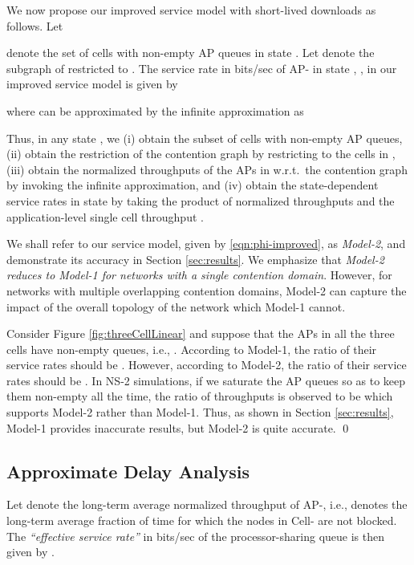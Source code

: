 \documentclass[10pt,a4paper,journal]{IEEEtran}
\theoremstyle{definition}
\theoremstyle{remark}
\theoremstyle{plain}
\begin{document}
We now propose our improved service model with short-lived downloads as follows. Let 
 
denote the set of cells with non-empty AP queues in state . Let  denote the subgraph of  restricted to . The service rate  in bits/sec of AP- in state , , in our improved service model is given by 
 
where  can be approximated by the infinite  approximation as 



Thus, in any state , we (i) obtain the subset  of cells with non-empty AP queues, (ii) obtain the restriction  of the contention graph  by restricting  to the cells in , (iii) obtain the normalized throughputs of the APs in  w.r.t.~the contention graph  by invoking the infinite  approximation, and (iv) obtain the state-dependent service rates in state  by taking the product of normalized throughputs and the application-level single cell throughput  . 

We shall refer to our service model, given by \eqref{eqn:phi-improved}, as \textit{Model-2}, and demonstrate its accuracy in Section \ref{sec:results}. We emphasize that \textit{Model-2 reduces to Model-1 for networks with a single contention domain}. However, for networks with multiple overlapping contention domains, Model-2 can capture the impact of the overall topology of the network which Model-1 cannot.


\begin{example}
\label{ex:three-cell-linear}
Consider Figure \ref{fig:threeCellLinear} and suppose that the APs in all the three cells have non-empty queues, i.e., . According to Model-1, the ratio of their service rates should be . However, according to Model-2, the ratio of their service rates should be . In NS-2 simulations, if we saturate the AP queues so as to keep them non-empty all the time, the ratio of throughputs is observed to be  which supports Model-2 rather than Model-1. Thus, as shown in Section \ref{sec:results}, Model-1 provides inaccurate results, but Model-2 is quite accurate. \hfill \qed
\end{example}




\subsection{Approximate Delay Analysis}
\label{subsubsec:delay-analysis}

Let  denote the long-term average normalized throughput of AP-, i.e.,  denotes the long-term average fraction of time for which the nodes in Cell- are not blocked. The \textit{``effective service rate''}  in bits/sec of the  processor-sharing queue is then given by . 
\end{document}
